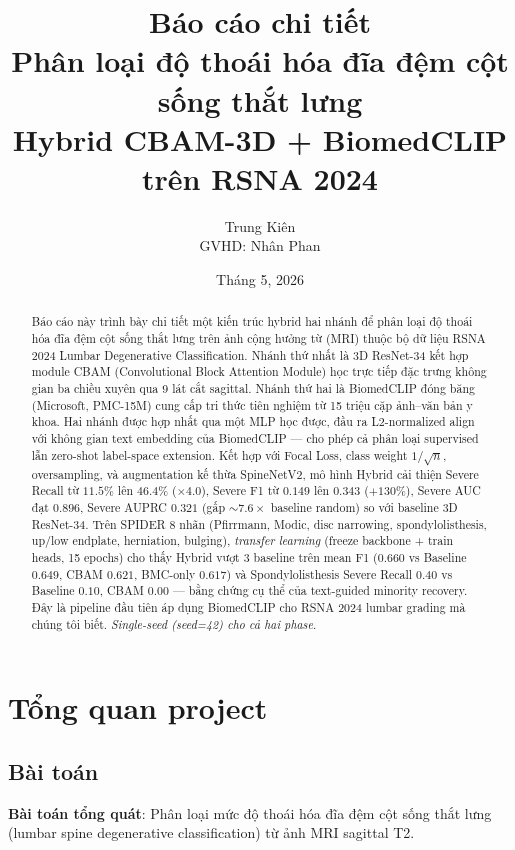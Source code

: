 \documentclass[11pt,a4paper]{article}
\title{\textbf{Báo cáo chi tiết}\\
       \large Phân loại độ thoái hóa đĩa đệm cột sống thắt lưng\\
       Hybrid CBAM-3D + BiomedCLIP trên RSNA 2024}
\author{Trung Kiên\\
        \small GVHD: Nh\^an Phan}
\date{Tháng 5, 2026}
\begin{document}
\maketitle

\begin{abstract}
\noindent Báo cáo này trình bày chi tiết một kiến trúc hybrid hai nhánh để
phân loại độ thoái hóa đĩa đệm cột sống thắt lưng trên ảnh cộng hưởng từ
(MRI) thuộc bộ dữ liệu RSNA 2024 Lumbar Degenerative Classification.
Nhánh thứ nhất là 3D ResNet-34 kết hợp module CBAM (Convolutional Block
Attention Module) học trực tiếp đặc trưng không gian ba chiều xuyên qua
9 lát cắt sagittal. Nhánh thứ hai là BiomedCLIP đóng băng (Microsoft,
PMC-15M) cung cấp tri thức tiên nghiệm từ 15 triệu cặp ảnh--văn bản y
khoa. Hai nhánh được hợp nhất qua một MLP học được, đầu ra L2-normalized
align với không gian text embedding của BiomedCLIP --- cho phép cả
phân loại supervised lẫn zero-shot label-space extension. Kết hợp với
Focal Loss, class weight $1/\sqrt{n}$, oversampling, và augmentation kế
thừa SpineNetV2, mô hình Hybrid cải thiện Severe Recall từ $11.5\%$
lên $46.4\%$ ($\times 4.0$), Severe F1 từ $0.149$ lên $0.343$
($+130\%$), Severe AUC đạt $0.896$, Severe AUPRC $0.321$ (gấp $\sim
7.6\times$ baseline random) so với baseline 3D ResNet-34. Trên SPIDER
8 nhãn (Pfirrmann, Modic, disc narrowing, spondylolisthesis, up/low
endplate, herniation, bulging), \emph{transfer learning} (freeze
backbone + train heads, 15 epochs) cho thấy Hybrid vượt 3 baseline trên
mean F1 ($0.660$ vs Baseline $0.649$, CBAM $0.621$, BMC-only $0.617$)
và Spondylolisthesis Severe Recall $0.40$ vs Baseline $0.10$, CBAM
$0.00$ --- bằng chứng cụ thể của text-guided minority recovery. Đây là
pipeline đầu tiên áp dụng BiomedCLIP cho RSNA 2024 lumbar grading mà
chúng tôi biết. \emph{Single-seed (seed=42) cho cả hai phase}.
\end{abstract}

\tableofcontents
\newpage

\section{Tổng quan project}

\subsection{Bài toán}

\noindent\textbf{Bài toán tổng quát}: Phân loại mức độ thoái hóa đĩa đệm
cột sống thắt lưng (lumbar spine degenerative classification) từ ảnh
MRI sagittal T2.
\end{document}
